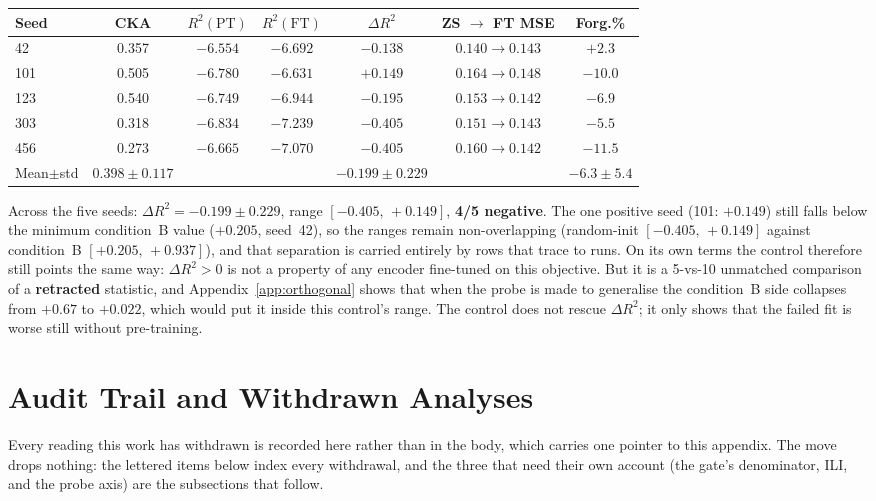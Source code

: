 \begin{center}
\small
\begin{tabular}{lcccccc}
\toprule
Seed & CKA & $R^2(\text{PT})$ & $R^2(\text{FT})$ & $\Delta R^2$ & ZS $\to$ FT MSE & Forg.\% \\
\midrule
42  & 0.357 & $-6.554$ & $-6.692$ & $-0.138$ & $0.140 \to 0.143$ & $+2.3$ \\
101 & 0.505 & $-6.780$ & $-6.631$ & $+0.149$ & $0.164 \to 0.148$ & $-10.0$ \\
123 & 0.540 & $-6.749$ & $-6.944$ & $-0.195$ & $0.153 \to 0.142$ & $-6.9$ \\
303 & 0.318 & $-6.834$ & $-7.239$ & $-0.405$ & $0.151 \to 0.143$ & $-5.5$ \\
456 & 0.273 & $-6.665$ & $-7.070$ & $-0.405$ & $0.160 \to 0.142$ & $-11.5$ \\
\midrule
Mean$\pm$std & $0.398{\pm}0.117$ & & & $-0.199{\pm}0.229$ & & $-6.3{\pm}5.4$ \\
\bottomrule
\end{tabular}
\end{center}

Across the five seeds: $\Delta R^2{=}{-}0.199{\pm}0.229$, range
$[-0.405,\,+0.149]$, \textbf{4/5 negative}.  The one positive seed
(101: $+0.149$) still falls below the minimum condition~B value
($+0.205$, seed~42), so the ranges remain non-overlapping
(random-init $[-0.405,\,+0.149]$ against condition~B $[+0.205,\,+0.937]$), and
that separation is carried entirely by rows that trace to runs.  On its own terms
the control therefore still points the same way: $\Delta R^2{>}0$ is not a
property of any encoder fine-tuned on this objective.  But it is a 5-vs-10
unmatched comparison of a \textbf{retracted} statistic, and
Appendix~\ref{app:orthogonal} shows that when the probe is made to generalise the
condition~B side collapses from $+0.67$ to $+0.022$, which would put it inside
this control's range.  The control does not rescue $\Delta R^2$; it only shows
that the failed fit is worse still without pre-training.

\section{Audit Trail and Withdrawn Analyses}
\label{app:audit}

Every reading this work has withdrawn is recorded here rather than in the body,
which carries one pointer to this appendix.  The move drops nothing: the lettered
items below index every withdrawal, and the three that need their own account (the
gate's denominator, ILI, and the probe axis) are the subsections that follow.

